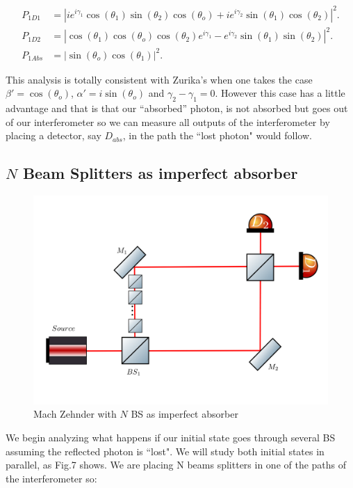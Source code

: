 \documentclass[12pt]{book}
\begin{document}
\begin{align}
P_{1D1}&=|ie^{i\gamma_{1}}\cos(\theta_{1})\sin(\theta_{2})\cos(\theta_{o})+i e^{i\gamma_{2}}\sin(\theta_{1})\cos(\theta_{2})|^2. \\
P_{1D2}&=|\cos(\theta_{1})\cos(\theta_{o})\cos(\theta_{2})e^{i\gamma_{1}}-e^{i\gamma_{2}} \sin(\theta_{1})\sin(\theta_{2})|^2.\\
P_{1Abs}&=|\sin(\theta_{o}) \cos(\theta_{1})|^2.
\end{align}


This analysis is totally consistent with Zurika's \cite{zuri} when one takes the case $\beta'=\cos(\theta_{o})$, $\alpha'=i \sin(\theta_{o})$ and $\gamma_{2}-\gamma_{1}=0$. However this case has a little advantage and that is that our ``absorbed'' photon, is not absorbed but goes out of our interferometer so we can measure all outputs of the interferometer by placing a detector, say $D_{abs}$, in the path the ``lost photon" would follow.

\subsection{$N$ Beam Splitters as imperfect absorber }
\vspace{1 cm}


\begin{figure}[hbt!]
\centering
\includegraphics[width=\linewidth,height=8 cm]{images/machzenhderBSS.png}
\caption{Mach Zehnder with $N$ BS as imperfect absorber}
\label{fig:BS2}
\end{figure}


We begin analyzing what happens if our initial state goes through several BS assuming the reflected photon is ``lost". We will study both initial states in parallel, as Fig.7 shows. We are placing N beams splitters in one of the paths of the interferometer so:
\end{document}
